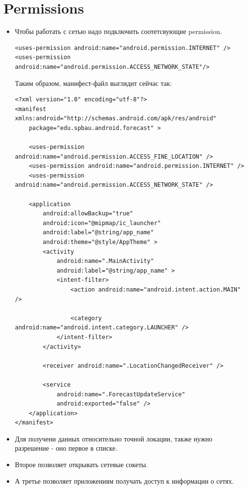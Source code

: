 \documentclass[12 pt]{article}
\begin{document}
\section{Permissions}
    \begin{itemize}
        \item Чтобы работать с сетью надо подключить соотетсвующие permission.
        \begin{lstlisting}
<uses-permission android:name="android.permission.INTERNET" /> 
<uses-permission  android:name="android.permission.ACCESS_NETWORK_STATE"/>        
        \end{lstlisting}
        
        Таким образом, манифест-файл выглядит сейчас так:
        \begin{lstlisting}
<?xml version="1.0" encoding="utf-8"?>
<manifest xmlns:android="http://schemas.android.com/apk/res/android"
    package="edu.spbau.android.forecast" >

    <uses-permission android:name="android.permission.ACCESS_FINE_LOCATION" />
    <uses-permission android:name="android.permission.INTERNET" />
    <uses-permission android:name="android.permission.ACCESS_NETWORK_STATE" />

    <application
        android:allowBackup="true"
        android:icon="@mipmap/ic_launcher"
        android:label="@string/app_name"
        android:theme="@style/AppTheme" >
        <activity
            android:name=".MainActivity"
            android:label="@string/app_name" >
            <intent-filter>
                <action android:name="android.intent.action.MAIN" />

                <category android:name="android.intent.category.LAUNCHER" />
            </intent-filter>
        </activity>

        <receiver android:name=".LocationChangedReceiver" />

        <service
            android:name=".ForecastUpdateService"
            android:exported="false" />
    </application>
</manifest>        
        \end{lstlisting}
        \item Для получени данных относительно точной локации, также нужно разрешение - оно первое в списке.
        \item Второе позволяет открывать сетевые сокеты.
        \item А третье позволяет приложениям получать доступ к информации о сетях.
    \end{itemize}
    
\end{document}

